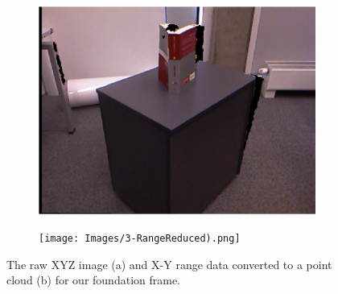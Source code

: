 \begin{figure}[H]
	\centering
	\begin{subfigure}[b]{0.45\textwidth}
		\centering
		\includegraphics[width=\textwidth]{Images/1-Image(1).png}
		\caption{}
	\end{subfigure}%
	\hspace{1cm}
	\begin{subfigure}[b]{0.45\textwidth}
		\centering
		\texttt{[image: Images/3-RangeReduced).png]}
		\caption{}
	\end{subfigure}
	\caption{The raw XYZ image (a) and X-Y range data converted to a point cloud (b) for our foundation frame.}
	\label{fig:preprocessing}
\end{figure}